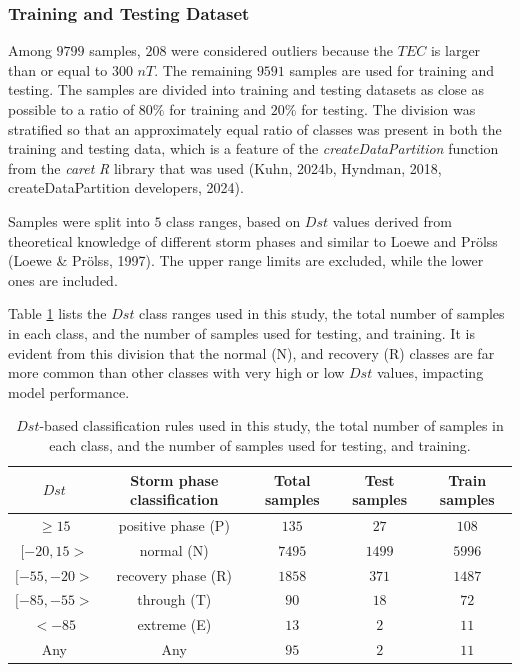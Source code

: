 \documentclass[sn-mathphys-num]{sn-jnl}%
\begin{document}
\subsubsection{Training and Testing Dataset}

Among $9799$ samples, $208$ were considered outliers because the $TEC$ is larger than or equal to $300$ $nT$. The remaining $9591$ samples are used for training and testing. The samples are divided into training and testing datasets as close as possible to a ratio of $80\%$ for training and $20\%$ for testing. The division was stratified so that an approximately equal ratio of classes was present in both the training and testing data, which is a feature of the \textit{createDataPartition} function from the \textit{caret} \textit{R} library that was used (Kuhn, 2024b, Hyndman, 2018, createDataPartition developers, 2024).

Samples were split into $5$ class ranges, based on $Dst$ values derived from theoretical knowledge of different storm phases and similar to Loewe and Prölss (Loewe & Prölss, 1997). The upper range limits are excluded, while the lower ones are included. 

Table \ref{tab:Dstranges} lists the $Dst$ class ranges used in this study, the total number of samples in each class, and the number of samples used for testing, and training. It is evident from this division that the normal (N), and recovery (R) classes are far more common than other classes with very high or low $Dst$ values, impacting model performance.

\begin{table}[!ht]
    \centering
    \caption{$Dst$-based classification rules used in this study, the total number of samples in each class, and the number of samples used for testing, and training.}
    \label{tab:Dstranges}
    \begin{tabular}{|c|c|c|c|c|}
        \hline
        $Dst$ & Storm phase classification & Total samples & Test samples & Train samples \\ \hline
        $ \geq 15 $ & positive phase (P) & $135$ & $27$ & $108$ \\ \hline
        $[-20, 15>$ & normal (N) & $7495$ & $1499$ & $5996$ \\ \hline
        $[-55, -20>$ & recovery phase (R) & $1858$ & $371$ & $1487$ \\ \hline
        $[-85, -55>$ & through (T) & $90$ & $18$ & $72$ \\ \hline
        $ < -85$ & extreme (E) & $13$ & $2$ & $11$ \\ \hline
        Any & Any & $95$ & $2$ & $11$ \\ \hline
    \end{tabular}
\end{table}
\end{document}
